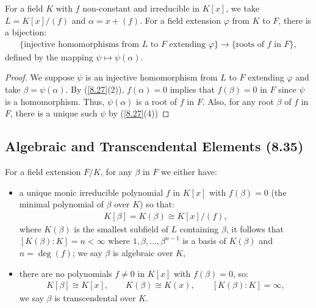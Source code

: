 For a field $K$ with $f$ non-constant and irreducible in $K[x]$, we take $L = K[x] / (f)$
and $\alpha = x + (f)$. For a field extension $\varphi$ from $K$ to $F$, there is a
bijection: \begin{align*}
    \{\text{injective homomorphisms from $L$ to $F$ extending $\varphi$}\}
    \to
    \{\text{roots of $f$ in $F$}\},
\end{align*} defined by the mapping $\psi \mapsto \psi(\alpha)$.

\begin{proof}
    We suppose $\psi$ is an injective homomorphism from $L$ to $F$ extending $\varphi$
    and take $\beta = \psi(\alpha)$.
    By (\ref{8.27}(2)), $f(\alpha) = 0$ implies that $f(\beta) = 0$ in $F$ since $\psi$
    is a homomorphism. Thus, $\psi(\alpha)$ is a root of $f$ in $F$.
    Also, for any root $\beta$ of $f$ in $F$, there is a unique such $\psi$ by (\ref{8.27}(4))
\end{proof}

\subsection{Algebraic and Transcendental Elements (8.35)} \label{8.35}

For a field extension $F / K$, for any $\beta$ in $F$ we either have: \begin{itemize}
    \item a unique monic irreducible polynomial $f$ in $K[x]$ with $f(\beta) = 0$
        (the minimal polynomial of $\beta$ over $K$) so that: \begin{align*}
            K[\beta] = K(\beta) \cong K[x] / (f),
        \end{align*} where $K(\beta)$ is the smallest subfield of $L$ containing $\beta$,
        it follows that \linebreak
        $[K(\beta) : K] = n < \infty$ where $1, \beta, \ldots, \beta^{n - 1}$
        is a basis of $K(\beta)$ and $n = \deg(f)$; we say $\beta$ is algebraic over $K$,
    \item there are no polynomials $f \neq 0$ in $K[x]$ with $f(\beta) = 0$, so: \begin{align*}
            K[\beta] \cong K[x], \qquad K(\beta) \cong K(x), \qquad [K(\beta) : K] = \infty,
        \end{align*} we say $\beta$ is transcendental over $K$.
\end{itemize}

